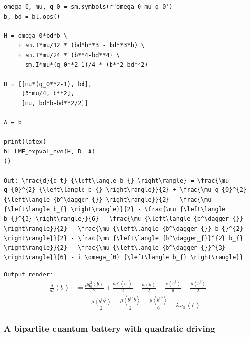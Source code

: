 \documentclass[onecolumn, 12pt, sort&compress]{elsarticle}
\newcommand{\inlinecode}[1]{\texttt{#1}}
\newenvironment{revision2}{%
\color{red}
}
{}
\begin{document}
\begin{verbatim}
omega_0, mu, q_0 = sm.symbols(r"omega_0 mu q_0")
b, bd = bl.ops()

H = omega_0*bd*b \
    + sm.I*mu/12 * (bd*b**3 - bd**3*b) \
    + sm.I*mu/24 * (b**4-bd**4) \
    - sm.I*mu*(q_0**2-1)/4 * (b**2-bd**2)

D = [[mu*(q_0**2-1), bd],
     [3*mu/4, b**2],
     [mu, bd*b-bd**2/2]]

A = b

print(latex(
bl.LME_expval_evo(H, D, A)
))

Out: \frac{d}{d t} {\left\langle b_{} \right\rangle} = \frac{\mu q_{0}^{2} {\left\langle b_{} \right\rangle}}{2} + \frac{\mu q_{0}^{2} {\left\langle {b^\dagger_{}} \right\rangle}}{2} - \frac{\mu {\left\langle b_{} \right\rangle}}{2} - \frac{\mu {\left\langle b_{}^{3} \right\rangle}}{6} - \frac{\mu {\left\langle {b^\dagger_{}} \right\rangle}}{2} - \frac{\mu {\left\langle {b^\dagger_{}} b_{}^{2} \right\rangle}}{2} - \frac{\mu {\left\langle {b^\dagger_{}}^{2} b_{} \right\rangle}}{2} - \frac{\mu {\left\langle {b^\dagger_{}}^{3} \right\rangle}}{6} - i \omega_{0} {\left\langle b_{} \right\rangle}}
\end{verbatim}
\begin{revision2}
\inlinecode{Output render:}
\begin{align*}
\frac{d}{d t} {\left\langle b_{} \right\rangle} &= \frac{\mu q_{0}^{2} {\left\langle b_{} \right\rangle}}{2} + \frac{\mu q_{0}^{2} {\left\langle {b^\dagger_{}} \right\rangle}}{2} - \frac{\mu {\left\langle b_{} \right\rangle}}{2} - \frac{\mu {\left\langle b_{}^{3} \right\rangle}}{6} - \frac{\mu {\left\langle {b^\dagger_{}} \right\rangle}}{2} \\ &\quad - \frac{\mu {\left\langle {b^\dagger_{}} b_{}^{2} \right\rangle}}{2} - \frac{\mu {\left\langle {b^\dagger_{}}^{2} b_{} \right\rangle}}{2} - \frac{\mu {\left\langle {b^\dagger_{}}^{3} \right\rangle}}{6} - i \omega_{0} {\left\langle b_{} \right\rangle}
\end{align*}
\end{revision2}

\subsubsection{A bipartite quantum battery with quadratic driving}
\end{document}
